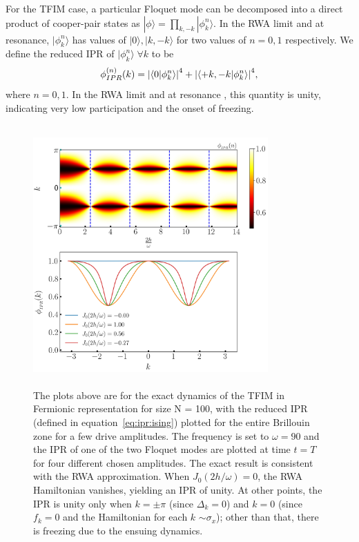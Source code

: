 \documentclass[%
reprint,
superscriptaddress,
amsmath,amssymb,
aps,
prb,
]{revtex4-2}
\begin{document}
	For the TFIM case,  a particular Floquet mode can be decomposed into a direct product of cooper-pair states as $|\phi\rangle = \prod_{k,-k}|\phi^n_k\rangle$. In the RWA limit and at resonance, $|\phi^n_k\rangle$ has values of $|0\rangle, |k,-k\rangle$ for two values of $n=0,1$ respectively. We define the reduced IPR of $|\phi^n_k\rangle\; \forall k$ to be
	\begin{equation}
	\label{eq:ipr:ising}
	\phi^{(n)}_{IPR}(k) = \abs{\ip{0}{\phi^n_k}}^4 + \abs{\ip{ +k, -k }{\phi^n_k}}^4,
	\end{equation}
	where $n=0,1$. In the RWA limit and at resonance , this quantity is unity, indicating very low participation and the onset of freezing.
	\begin{figure}[hbt!]
		\centering
		\includegraphics[height = 10cm, width = 9.0cm]{ising_exact_ipr.jpeg}
		\caption{The plots above are for the exact dynamics of the TFIM in Fermionic representation for size N = 100, with the reduced IPR (defined in equation~\ref{eq:ipr:ising}) plotted for the entire Brillouin zone for a few drive amplitudes. The frequency is set to $\omega = 90$ and the IPR of one of the two Floquet modes are plotted at time $t=T$ for four different chosen amplitudes. The exact result is consistent with the RWA approximation. When $J_0(2h/\omega) = 0$, the RWA Hamiltonian vanishes, yielding an IPR of unity. At other points, the IPR is unity only when $k=\pm \pi$ (since $\Delta_k=0$) and $k=0$ (since $f_k = 0$ and the Hamiltonian for each $k$ $\sim \sigma_x$); other than that, there is freezing due to the ensuing dynamics.}
		\label{fig:ipr:tfim}
	\end{figure}
\end{document}

